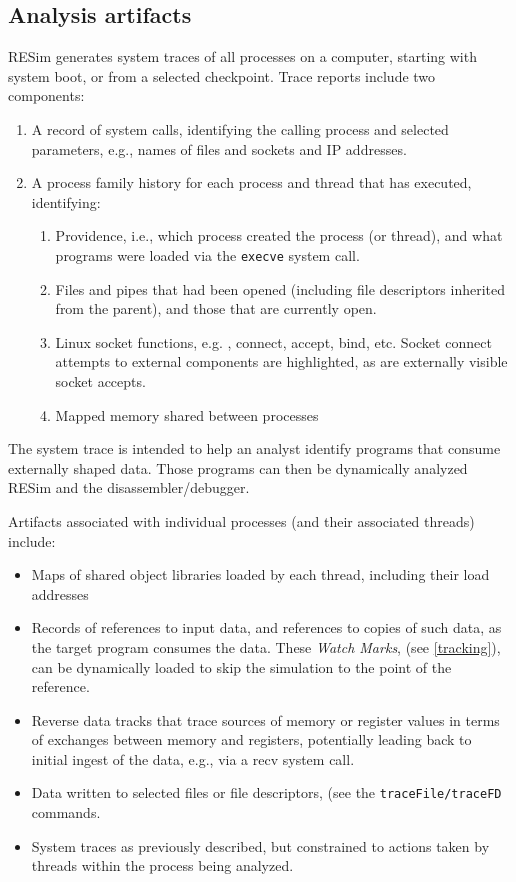 \documentclass[titlepage]{article}
\begin{document}
\subsection{Analysis artifacts}
RESim generates system traces of all processes on a computer, starting with system boot, or from a selected checkpoint.  Trace reports include two components: 
\begin{enumerate}
\item A record of system calls, identifying the calling process and selected parameters, e.g., names of files and sockets and IP addresses.
\item A process family history for each process and thread that has executed, identifying:
\begin{enumerate}
\item Providence, i.e., which process created the process (or thread), and what programs were loaded via the {\tt execve} system call.
\item Files and pipes that had been opened (including file descriptors inherited from the parent), and those that are currently open.
\item Linux socket functions, e.g. , connect, accept, bind, etc.  Socket connect attempts to external components are highlighted, as are 
externally visible socket accepts.
\item Mapped memory shared between processes
\end{enumerate}
\end{enumerate}

The system trace is intended to help an analyst identify programs that consume externally shaped data.  Those programs can then be dynamically analyzed 
RESim and the disassembler/debugger. 

Artifacts associated with individual processes (and their associated threads) include:
\begin{itemize}
\item Maps of shared object libraries loaded by each thread, including their load addresses
\item Records of references to input data, and references to copies of such data, as the target program consumes the data.  These \textit{Watch Marks}, 
(see \ref{tracking}), can be dynamically loaded to skip the simulation to the point of the reference.
\item Reverse data tracks that trace sources of memory or register values in terms of exchanges between memory and registers, potentially leading
back to initial ingest of the data, e.g., via a recv system call.
\item Data written to selected files or file descriptors, (see the {\tt traceFile/traceFD} commands.
\item System traces as previously described, but constrained to actions taken by threads within the process being analyzed.
\end{itemize}
\end{document}
